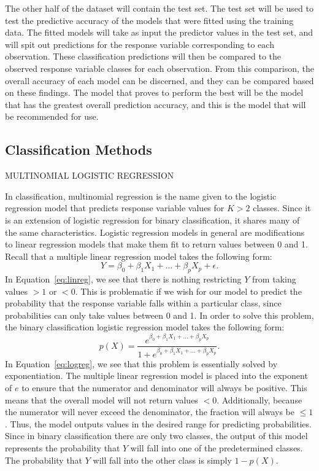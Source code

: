 \documentclass[12pt]{article}
\begin{document}
The other half of the dataset will contain the test set.  The test set will be used to 
test the predictive accuracy of the models that were fitted using the training data.  
The fitted models will take as input the predictor values in the test set, and will 
spit out predictions for the response variable corresponding to each observation.  
These classification predictions will then be compared to the observed response variable 
classes for each observation.  From this comparison, the overall accuracy of each model 
can be discerned, and they can be compared based on these findings.  The model that 
proves to perform the best will be the model that has the greatest overall prediction 
accuracy, and this is the model that will be recommended for use. 


\subsection{Classification Methods}
\label{sec:class}

MULTINOMIAL LOGISTIC REGRESSION

In classification, multinomial regression is the name given to the 
logistic regression model that predicts response variable values for 
$K > 2$ classes.  Since it is an extension of logistic regression for 
binary classification, it shares many of the same characteristics.  
Logistic regression models in general are modifications to linear 
regression models that make them fit to return values between 0 and 1.  
Recall that a multiple linear regression model takes the following form:
\begin{equation}
  \label{eq:linreg}
  Y = \beta_0 + \beta_1X_1 + ... + \beta_pX_p + \epsilon.
\end{equation}
In Equation~\eqref{eq:linreg}, we see that there is nothing restricting 
$Y$ from taking values $> 1$ or $< 0$.  This is problematic if we wish 
for our model to predict the probability that the response variable 
falls within a particular class, since probabilities can only take 
values between 0 and 1.  In order to solve this problem, the binary 
classification logistic regression model takes the following form:
\begin{equation}
  \label{eq:logreg}
  p(X) = 
  \frac{e ^ {\beta_0 + \beta_1X_1 + ... + \beta_pX_p}} 
  {1 + e ^ {\beta_0 + \beta_1X_1 + ... + \beta_pX_p}}.
\end{equation}
In Equation~\eqref{eq:logreg}, we see that this problem is essentially 
solved by exponentiation.  The multiple linear regression model is 
placed into the exponent of $e$ to ensure that the numerator and 
denominator will always be positive.  This means that the overall 
model will not return values $< 0$.  Additionally, because the numerator 
will never exceed the denominator, the fraction will always be $\leq 1$.  
Thus, the model outputs values in the desired range for predicting probabilities. 
 Since in binary classification there are only two classes, the output of 
 this model represents the probability that $Y$ will fall into one of the 
 predetermined classes.  The probability that $Y$ will fall into the other 
 class is simply $1 - p(X)$.
\end{document}
